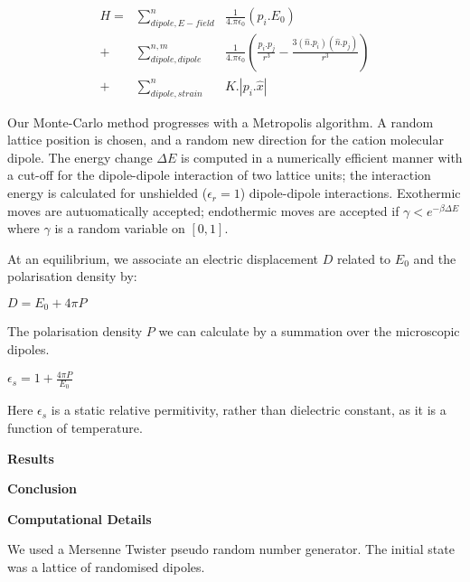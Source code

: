 \documentclass[journal=jacsat,manuscript=communication]{achemso}
\begin{document}
\begin{align}
H = &\sum^n_{dipole,E-field} &\frac{1}{4.\pi \epsilon_0} (p_i.E_0) \\
+ &\sum^{n,m}_{dipole,dipole} &\frac{1}{4.\pi \epsilon_0} (\frac{p_i.p_j}{r^3}-\frac{3(\hat{n}.p_i)(\hat{n}.p_j)}{r^3}) \\
+ &\sum^n_{dipole,strain} &K.|p_i.\hat{x}|
\end{align}  

Our Monte-Carlo method progresses with a Metropolis algorithm. 
A random lattice position is chosen, and a random new direction for the cation molecular dipole. 
The energy change $\Delta E$ is computed in a numerically efficient manner with a cut-off for the dipole-dipole interaction of two lattice units; the interaction energy is calculated for unshielded ($\epsilon_r =1$) dipole-dipole interactions. 
Exothermic moves are autuomatically accepted; endothermic moves are accepted if $\gamma < e^{-\beta \Delta E}$ where $\gamma$ is a random variable on $[0,1]$.

At an equilibrium, we associate an electric displacement $D$ related to $E_0$ and the polarisation density by:

$D =  E_0 + 4\pi P$

The polarisation density $P$ we can calculate by a summation over the microscopic dipoles. 

$\epsilon_s = 1+ \frac{4\pi P}{E_0}$

Here $\epsilon_s$ is a static relative permitivity, rather than dielectric constant, as it is a function of temperature.



\textbf{Results}

\textbf{Conclusion}

\textbf{Computational Details}

We used a Mersenne Twister\cite{matsumoto_mersenne_1998} pseudo random number generator. The initial state was a lattice of randomised dipoles.

\end{document}
